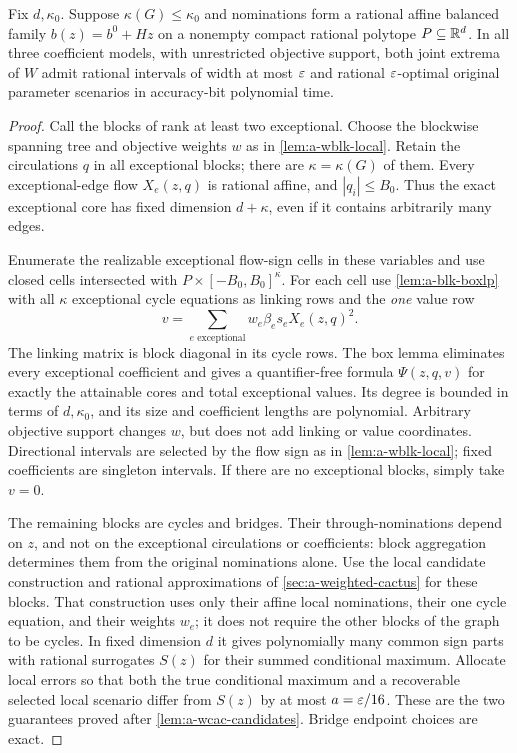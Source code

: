 \begin{theorem}
\label{thm:a-wblk-hybrid}
Fix $d,\kappa_0$. Suppose $\kappa(G)\le\kappa_0$ and nominations form a
rational affine balanced family $b(z)=b^0+Hz$ on a nonempty compact
rational polytope $P\subseteq\mathbb{R}^d$. In all three coefficient models,
with unrestricted objective support, both joint extrema of $W$ admit
rational intervals of width at most $\varepsilon$ and rational $\varepsilon$-optimal
original parameter scenarios in accuracy-bit polynomial time.
\end{theorem}
\begin{proof}
Call the blocks of rank at least two exceptional. Choose the blockwise
spanning tree and objective weights $w$ as in \cref{lem:a-wblk-local}.
Retain the circulations $q$ in all exceptional blocks; there are
$\kappa=\kappa(G)$ of them. Every exceptional-edge flow $X_e(z,q)$ is
rational affine, and $|q_i|\le B_0$. Thus the exact exceptional core has
fixed dimension $d+\kappa$, even if it contains arbitrarily many edges.

Enumerate the realizable exceptional flow-sign cells in these variables
and use closed cells intersected with $P\times[-B_0,B_0]^\kappa$.
For each cell use \cref{lem:a-blk-boxlp} with all $\kappa$ exceptional
cycle equations as linking rows and the \emph{one} value row
\begin{equation}
 v=\sum_{e\text{ exceptional}}w_e\beta_e s_eX_e(z,q)^2.
 \label{eq:a-wblk-exceptional-row}
\end{equation}
The linking matrix is block diagonal in its cycle rows. The box lemma
eliminates every exceptional coefficient and gives a quantifier-free
formula $\Psi(z,q,v)$ for exactly the attainable cores and total
exceptional values. Its degree is bounded in terms of $d,\kappa_0$,
and its size and coefficient lengths are polynomial. Arbitrary objective
support changes $w$, but does not add linking or value coordinates.
Directional intervals are selected by the flow sign as in
\cref{lem:a-wblk-local}; fixed coefficients are singleton intervals.
If there are no exceptional blocks, simply take $v=0$.

The remaining blocks are cycles and bridges. Their through-nominations
depend on $z$, and not on the exceptional circulations or coefficients:
block aggregation determines them from the original nominations alone.
Use the local candidate construction and rational approximations of
\cref{sec:a-weighted-cactus} for these blocks. That construction uses
only their affine local nominations, their one cycle equation, and their
weights $w_e$; it does not require the other blocks of the graph to be
cycles. In fixed dimension $d$ it gives polynomially many common sign
parts with rational surrogates $S(z)$ for their summed conditional maximum.
Allocate local errors so that both the true conditional maximum and a
recoverable selected local scenario differ from $S(z)$ by at most
$a=\varepsilon/16$. These are the two guarantees proved after
\cref{lem:a-wcac-candidates}. Bridge endpoint choices are exact.


\end{proof}
